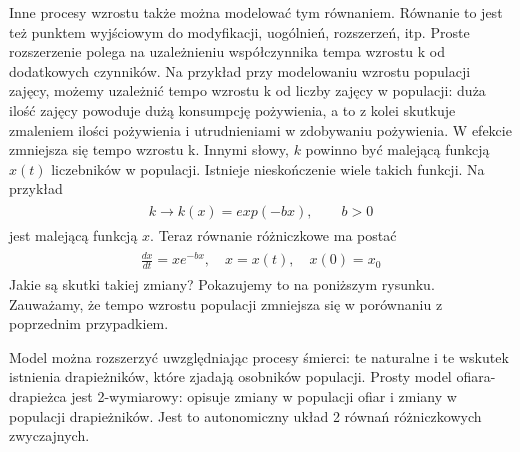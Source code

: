 \documentclass[a4paper,12pt,polish]{sphinxmanual}
\begin{document}
Inne procesy wzrostu także można modelować tym równaniem. Równanie to jest też punktem wyjściowym do modyfikacji, uogólnień, rozszerzeń, itp.  Proste rozszerzenie polega na uzależnieniu współczynnika tempa wzrostu k od dodatkowych czynników. Na przykład przy modelowaniu wzrostu populacji zajęcy, możemy uzależnić tempo wzrostu k od liczby zajęcy  w populacji: duża ilość zajęcy powoduje dużą konsumpcję pożywienia, a to z kolei skutkuje zmaleniem ilości pożywienia i utrudnieniami w zdobywaniu pożywienia. W efekcie zmniejsza się tempo wzrostu k. Innymi słowy, $k$ powinno być malejącą funkcją $x(t)$ liczebników w populacji.  Istnieje nieskończenie wiele takich funkcji.  Na przykład
\label{ch1/chI011:equation-eqn26}\begin{gather}
\begin{split}k  \to  k(x) = exp(-b x), \quad \quad b>0\end{split}\label{ch1/chI011-eqn26}
\end{gather}
jest malejącą funkcją $x$. Teraz równanie różniczkowe ma postać
\label{ch1/chI011:equation-eqn27}\begin{gather}
\begin{split}\frac{dx}{dt} = x e^{-bx}, \quad x = x(t), \quad x(0) = x_0\end{split}\label{ch1/chI011-eqn27}
\end{gather}
Jakie są skutki takiej zmiany? Pokazujemy to na poniższym rysunku. Zauważamy, że tempo wzrostu populacji zmniejsza się w porównaniu z poprzednim przypadkiem.

Model można rozszerzyć uwzględniając procesy śmierci: te naturalne i te wskutek istnienia drapieżników, które zjadają  osobników populacji. Prosty model  ofiara-drapieżca  jest 2-wymiarowy: opisuje zmiany w populacji ofiar i zmiany w populacji drapieżników. Jest to autonomiczny układ 2 równań różniczkowych zwyczajnych.
\end{document}
